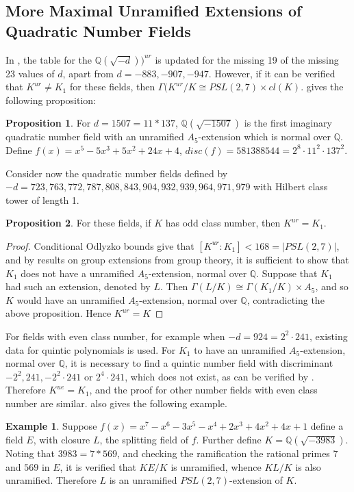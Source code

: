 \documentclass[12pt]{extarticle}
\newcommand{\Q}{\mathbb{Q}}
\newcommand{\<}{\langle}
\renewcommand{\>}{\rangle}
\theoremstyle{definition}
\newtheorem{proposition}{Proposition}
\newtheorem*{example}{Example}
\begin{document}
\subsection{More Maximal Unramified Extensions of Quadratic Number Fields}
In \cite{YAMA2001}, the table for the $\Q(\sqrt{-d}))^{ur}$ is updated for the missing 19 of the missing 23 values of $d$, apart from $d= -883,-907,-947$. However, if it can be verified that $K^{ur} \neq K_1$ for these fields, then $\Gamma(K^{ur}/K \cong PSL(2,7) \times cl(K)$. 
\cite{YAMA1997} gives the following proposition: \begin{proposition}
For $d=1507 = 11*137$, $\Q(\sqrt{-1507})$ is the first imaginary quadratic number field with an unramified $A_5$-extension which is normal over $\Q$.
Define $f(x) = x^5 -5x^3 + 5x^2 + 24x + 4$, $disc(f) = 581388544 = 2^8 \cdot 11^2 \cdot 137^2$. 
\end{proposition}
Consider now the quadratic number fields defined by $-d = 723, 763, 772, 787,808,843, 904, 932, 939, 964, 971, 979$ with Hilbert class tower of length 1. 
\begin{proposition}
For these fields, if $K$ has odd class number, then $K^{ur} = K_1$. 
\end{proposition}
\begin{proof}
 Conditional Odlyzko bounds give that $[K^{ur}:K_1]<168 = |PSL(2,7)|$, and by results on group extensions from group theory, it is sufficient to show that $K_1$ does not have a unramified $A_5$-extension, normal over $\Q$. Suppose that $K_1$ had such an extension, denoted by $L$. Then $\Gamma(L/K) \cong \Gamma(K_1/K) \times A_5$, and so $K$ would have an unramified $A_5$-extension, normal over $\Q$, contradicting the above proposition. Hence $K^{ur} = K$

\end{proof}
For fields with even class number, for example when $-d = 924 = 2^2 \cdot 241$, existing data for quintic polynomials is used. For $K_1$ to have an unramified $A_5$-extension, normal over $\Q$, it is necessary to find a quintic number field with discriminant $-2^2,241,-2^2 \cdot 241$ or $2^4 \cdot 241$, which does not exist, as can be verified by \cite{JONE2}. Therefore $K^{ue} = K_1$, and the proof for other number fields with even class number are similar. 
\cite{YAMA2001} also gives the following example. 
\begin{example}
Suppose $f(x) = x^7 - x^6 - 3x^5 - x^4 + 2x^3 + 4x^2 + 4x + 1$ define a field $E$, with closure $L$, the splitting field of $f$. Further define $K=\Q(\sqrt{-3983})$. Noting that $3983 = 7*569$, and checking the ramification the rational primes $7$ and $569$ in $E$, it is verified that $KE/K$ is unramified, whence $KL/K$ is also unramified. Therefore $L$ is an unramified $PSL(2,7)$-extension of $K$. 
\end{example}
\end{document}
